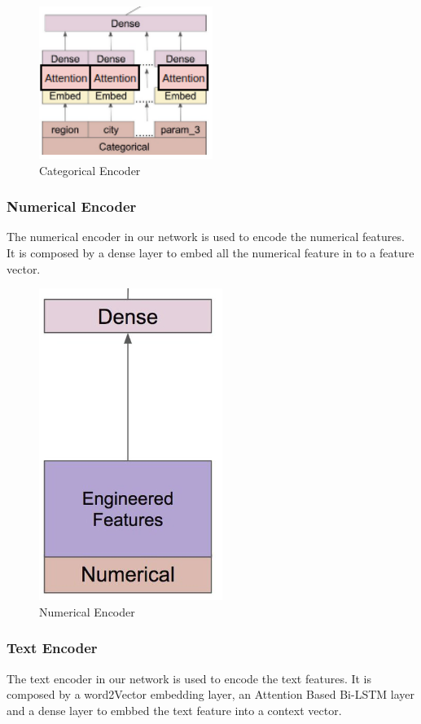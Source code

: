 \documentclass{article}
\begin{document}
\begin{figure}[h]
  \centering
  \includegraphics[scale=1]{cat.png}
  \caption{Categorical Encoder}
\end{figure}


\subsubsection{Numerical Encoder}

The numerical encoder in our network is used to encode the numerical features. It is composed by a dense layer to embed all the numerical feature in to a feature vector.

\begin{figure}[h]
  \centering
  \includegraphics[scale=0.5]{numerical.png}
  \caption{Numerical Encoder}
\end{figure}

\subsubsection{Text Encoder}


The text encoder in our network is used to encode the text features. It is composed by a word2Vector  embedding layer, an Attention Based Bi-LSTM layer and a dense layer to embbed the text feature into a context vector.
\end{document}
